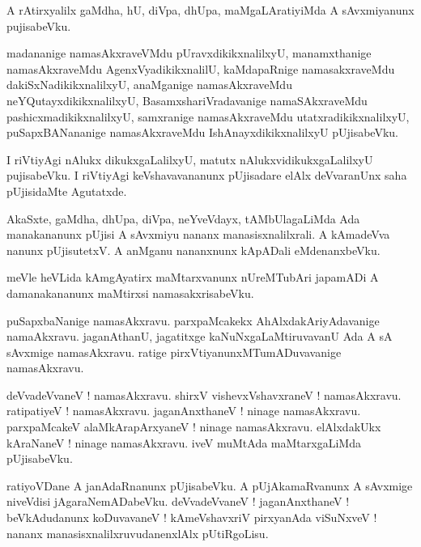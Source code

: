 \documentclass{article}
\begin{document}
\begin{mn}%
A rAtirxyalilx gaMdha, hU, diVpa, dhUpa, maMgaLAratiyiMda A sAvxmiyanunx pujisabeVku.
\end{mn}

\begin{mn}%
madananige namasAkxraveVMdu pUravxdikikxnalilxyU, manamxthanige namasAkxraveMdu 
AgenxVyadikikxnalilU, kaMdapaRnige namasakxraveMdu dakiSxNadikikxnalilxyU, anaMganige 
namasAkxraveMdu neYQutayxdikikxnalilxyU, BasamxshariVradavanige namaSAkxraveMdu 
pashicxmadikikxnalilxyU, samxranige namasAkxraveMdu utatxradikikxnalilxyU, puSapxBANananige 
namasAkxraveMdu IshAnayxdikikxnalilxyU pUjisabeVku.
\end{mn}

\begin{mn}%
I riVtiyAgi nAlukx dikukxgaLalilxyU, matutx nAlukxvidikukxgaLalilxyU pujisabeVku. I riVtiyAgi 
keVshavavananunx pUjisadare elAlx deVvaranUnx saha pUjisidaMte Agutatxde.
\end{mn}

\begin{mn}%
AkaSxte, gaMdha, dhUpa, diVpa, neYveVdayx, tAMbUlagaLiMda Ada manakananunx pUjisi A sAvxmiyu nananx 
manasisxnalilxrali. A kAmadeVva nanunx pUjisutetxV. A anMganu nananxnunx kApADali eMdenanxbeVku.
\end{mn}

\begin{mn}%
meVle heVLida kAmgAyatirx maMtarxvanunx nUreMTubAri japamADi A damanakananunx maMtirxsi 
namasakxrisabeVku.
\end{mn}

\begin{mn}%
puSapxbaNanige namasAkxravu. parxpaMcakekx AhAlxdakAriyAdavanige namaAkxravu. jaganAthanU, 
jagatitxge kaNuNxgaLaMtiruvavanU Ada A sA sAvxmige namasAkxravu. ratige 
pirxVtiyanunxMTumADuvavanige namasAkxravu.
\end{mn}

\begin{mn}%
deVvadeVvaneV ! namasAkxravu. shirxV vishevxVshavxraneV ! namasAkxravu. ratipatiyeV ! namasAkxravu. 
jaganAnxthaneV ! ninage namasAkxravu. parxpaMcakeV alaMkArapArxyaneV ! ninage namasAkxravu. 
elAlxdakUkx kAraNaneV ! ninage namasAkxravu. iveV muMtAda maMtarxgaLiMda pUjisabeVku.
\end{mn}

\begin{mn}%
ratiyoVDane A janAdaRnanunx pUjisabeVku. A pUjAkamaRvanunx A sAvxmige niveVdisi jAgaraNemADabeVku. 
deVvadeVvaneV ! jaganAnxthaneV ! beVkAdudanunx koDuvavaneV ! kAmeVshavxriV pirxyanAda viSuNxveV ! 
nananx manasisxnalilxruvudanenxlAlx pUtiRgoLisu.
\end{mn}
\end{document}
